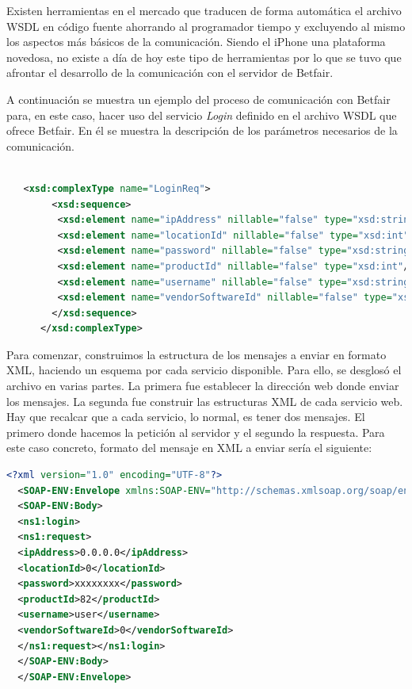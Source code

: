    Existen herramientas en el mercado que traducen de forma automática el archivo WSDL en código fuente ahorrando al programador tiempo y excluyendo al mismo los aspectos más básicos de la comunicación. Siendo el iPhone una plataforma novedosa, no existe a día de hoy este tipo de herramientas por lo que se tuvo que afrontar el desarrollo de la comunicación con el servidor de Betfair.
      
   A continuación se muestra un ejemplo del proceso de comunicación con Betfair para, en este caso, hacer uso del servicio \emph{Login } definido en el archivo WSDL que ofrece Betfair. En él se muestra la descripción de los parámetros necesarios de la comunicación.
   
\begin{lstlisting}[frame=single, language=xml,basicstyle=\small, keywordstyle = \color{blue}]

   <xsd:complexType name="LoginReq">
        <xsd:sequence>
         <xsd:element name="ipAddress" nillable="false" type="xsd:string"/>
         <xsd:element name="locationId" nillable="false" type="xsd:int"/>
         <xsd:element name="password" nillable="false" type="xsd:string"/>
         <xsd:element name="productId" nillable="false" type="xsd:int"/>
         <xsd:element name="username" nillable="false" type="xsd:string"/>
         <xsd:element name="vendorSoftwareId" nillable="false" type="xsd:int"/>
        </xsd:sequence>
      </xsd:complexType>
\end{lstlisting}


   Para comenzar, construimos la estructura de los mensajes a enviar en formato XML, haciendo un esquema por cada servicio disponible. Para ello, se desglosó el archivo en varias partes. La primera fue establecer la dirección web donde enviar los mensajes. La segunda fue construir las estructuras XML de cada servicio web. Hay que recalcar que a cada servicio, lo normal, es tener dos mensajes. El primero donde hacemos la petición al servidor y el segundo la respuesta. Para este caso concreto, formato del mensaje en XML a enviar sería el siguiente:
 
\begin{lstlisting}[frame=single, language=xml,basicstyle=\small, keywordstyle = \color{blue}]
  <?xml version="1.0" encoding="UTF-8"?>
  <SOAP-ENV:Envelope xmlns:SOAP-ENV="http://schemas.xmlsoap.org/soap/envelope/" xmlns:SOAP-ENC="http://schemas.xmlsoap.org/soap/encoding/" xmlns:xsi="http://www.w3.org/2001/XMLSchema-instance" xmlns:xsd="http://www.w3.org/2001/XMLSchema" xmlns:ns2="http://www.betfair.com/publicapi/types/global/v3/" xmlns:ns1="http://www.betfair.com/publicapi/v3/BFGlobalService/">
  <SOAP-ENV:Body>
  <ns1:login>
  <ns1:request>
  <ipAddress>0.0.0.0</ipAddress>
  <locationId>0</locationId>
  <password>xxxxxxxx</password>
  <productId>82</productId>
  <username>user</username>
  <vendorSoftwareId>0</vendorSoftwareId>
  </ns1:request></ns1:login>
  </SOAP-ENV:Body>
  </SOAP-ENV:Envelope> 
 \end{lstlisting}
 
